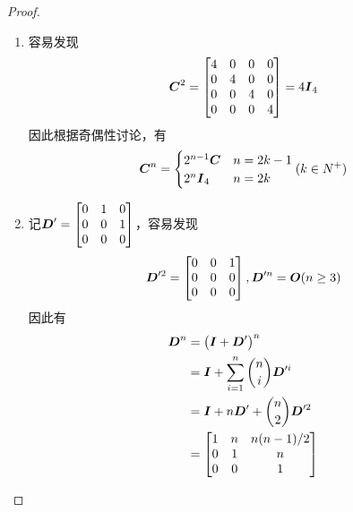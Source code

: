 \begin{proof}
\begin{enumerate}
        \item
              {
              容易发现
              \begin{equation*}
                  \boldsymbol{C}^2=
                  \begin{bmatrix}
                      4 & 0 & 0 & 0 \\
                      0 & 4 & 0 & 0 \\
                      0 & 0 & 4 & 0 \\
                      0 & 0 & 0 & 4
                  \end{bmatrix}=4\boldsymbol{I}_4
              \end{equation*}
              因此根据奇偶性讨论，有
              \begin{equation*}
                  \boldsymbol{C}^n=
                  \begin{cases}
                      2^{n-1}\boldsymbol{C} & n=2k-1 \\
                      2^n\boldsymbol{I}_4   & n=2k
                  \end{cases}
                  (k\in N^+)
              \end{equation*}
              }

        \item
              {
              记\(\boldsymbol{D}'=\begin{bmatrix}0&1&0\\0&0&1\\0&0&0\end{bmatrix}\)，容易发现
              \begin{equation*}
                  \boldsymbol{D}'^2=\begin{bmatrix}0&0&1\\0&0&0\\0&0&0\end{bmatrix},\boldsymbol{D}'^n=\boldsymbol{O}(n\ge3)
              \end{equation*}
              因此有
              \begin{align*}
                  \boldsymbol{D}^n & =\left( \boldsymbol{I}+\boldsymbol{D}' \right)^n                  \\
                          & =\boldsymbol{I}+\sum_{i=1}^n\binom{n}{i}\boldsymbol{D}'^i \\
                          & =\boldsymbol{I}+n\boldsymbol{D}'+\binom{n}{2}\boldsymbol{D}'^2     \\
                          & =\begin{bmatrix}
                                 1 & n & n(n-1)/2 \\
                                 0 & 1 & n        \\
                                 0 & 0 & 1
                             \end{bmatrix}
              \end{align*}
              }
    \end{enumerate}
\end{proof}

